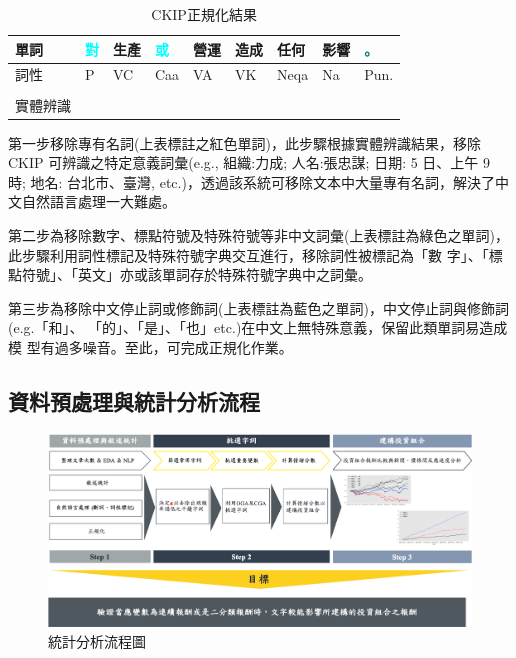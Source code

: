 \begin{table}[H]
\begin{center}
\begin{tabular}[c]{l|m{0.5cm}<{\centering}m{0.5cm}<{\centering}m{0.5cm}<{\centering}m{0.5cm}<{\centering}m{0.5cm}<{\centering}m{0.7cm}<{\centering}m{0.5cm}<{\centering}m{0.5cm}<{\centering}}
\toprule
單詞 & \textcolor{cyan}{對} & 生產 & \textcolor{cyan}{或} & 營運 & 造成 & 任何 & 影響 & \textcolor{teal}{。} \\
\hline
詞性 & P & VC & Caa & VA & VK & Neqa & Na & Pun. \\
 \\
\hline
實體辨識 &  &  &  &  &  &  &  & \\
\bottomrule
\end{tabular}
\end{center}
\caption{CKIP正規化結果}
\label{Tab 4.5}
\end{table}

第一步移除專有名詞(上表標註之紅色單詞)，此步驟根據實體辨識結果，移除 CKIP 可辨識之特定意義詞彙(e.g., 組織:力成; 人名:張忠謀; 日期: 5 日、上午 9 時; 地名: 台北市、臺灣, etc.)，透過該系統可移除文本中大量專有名詞，解決了中文自然語言處理一大難處。

第二步為移除數字、標點符號及特殊符號等非中文詞彙(上表標註為綠色之單詞)，此步驟利用詞性標記及特殊符號字典交互進行，移除詞性被標記為「數 字」、「標點符號」、「英文」亦或該單詞存於特殊符號字典中之詞彙。

第三步為移除中文停止詞或修飾詞(上表標註為藍色之單詞)，中文停止詞與修飾詞(e.g.「和」、 「的」、「是」、「也」etc.)在中文上無特殊意義，保留此類單詞易造成模 型有過多噪音。至此，可完成正規化作業。

\newpage

\subsection{資料預處理與統計分析流程}

\begin{figure}[htbp]
\centering
\includegraphics[width=1.1\textwidth]{images/流程圖.png}
\caption{統計分析流程圖}
\end{figure}



